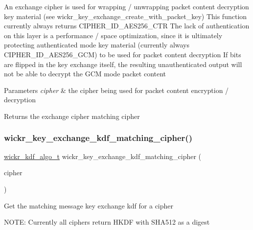 An exchange cipher is used for wrapping / unwrapping packet content decryption key material (see wickr\+\_\+key\+\_\+exchange\+\_\+create\+\_\+with\+\_\+packet\+\_\+key) This function currently always returns C\+I\+P\+H\+E\+R\+\_\+\+I\+D\+\_\+\+A\+E\+S256\+\_\+\+C\+TR The lack of authentication on this layer is a performance / space optimization, since it is ultimately protecting authenticated mode key material (currently always C\+I\+P\+H\+E\+R\+\_\+\+I\+D\+\_\+\+A\+E\+S256\+\_\+\+G\+CM) to be used for packet content decryption If bits are flipped in the key exchange itself, the resulting unauthenticated output will not be able to decrypt the G\+CM mode packet content


\begin{DoxyParams}{Parameters}
{\em cipher} & the cipher being used for packet content encryption / decryption \\
\hline
\end{DoxyParams}
\begin{DoxyReturn}{Returns}
the exchange cipher matching \textquotesingle{}cipher\textquotesingle{} 
\end{DoxyReturn}
\mbox{\label{group__wickr__crypto__engine_ga6cdd263ddccd0b28a85ed61889805e60}} 
\subsubsection{\texorpdfstring{wickr\+\_\+key\+\_\+exchange\+\_\+kdf\+\_\+matching\+\_\+cipher()}{wickr\_key\_exchange\_kdf\_matching\_cipher()}}
{\footnotesize\ttfamily \hyperlink{structwickr__kdf__algo}{wickr\+\_\+kdf\+\_\+algo\+\_\+t} wickr\+\_\+key\+\_\+exchange\+\_\+kdf\+\_\+matching\+\_\+cipher (\begin{DoxyParamCaption}\item[{\hyperlink{structwickr__cipher}{wickr\+\_\+cipher\+\_\+t}}]{cipher }\end{DoxyParamCaption})}

Get the matching message key exchange kdf for a cipher

N\+O\+TE\+: Currently all ciphers return H\+K\+DF with S\+H\+A512 as a digest


